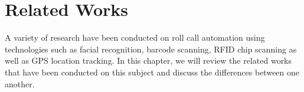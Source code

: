 \chapter{Related Works}
A variety of research have been conducted on roll call automation using technologies such as
facial recognition, barcode scanning, RFID chip scanning as well as GPS location tracking.
In this chapter, we will review the related works that have been conducted on this subject
and discuss the differences between one another.





